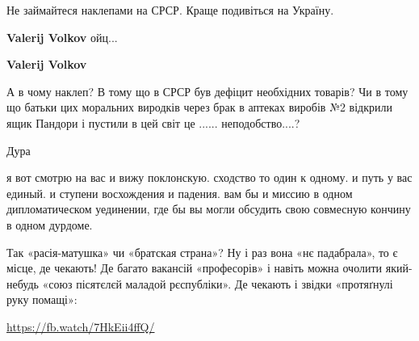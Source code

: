 \begin{itemize}
\begin{itemize}
Не займайтеся наклепами на СРСР.
Краще подивіться на Україну.

 
\textbf{Valerij Volkov} ойц...

 
\textbf{Valerij Volkov} 

А в чому наклеп? В тому що в СРСР був дефіцит необхідних
товарів? Чи в тому що батьки цих моральних виродків через брак в аптеках виробів
№2 відкрили ящик Пандори і пустили в цей світ це ...... неподобство....?


 
Дура
\end{itemize}


я вот смотрю на вас и вижу поклонскую. сходство то один к одному. и путь у вас
единый. и ступени восхождения и падения. вам бы и миссию в одном
дипломатическом уединении, где бы вы могли обсудить свою совмесную кончину в
одном дурдоме.


Так «расія-матушка» чи «братская страна»? Ну і раз вона «нє падабрала», то є
місце, де чекають! Де багато вакансій «професорів» і навіть можна очолити
який-небудь «союз пісятєлєй маладой рєспубліки». Де чекають і звідки
«протяґнулі руку помащі»:

\url{https://fb.watch/7HkEii4ffQ/}

\end{itemize}

